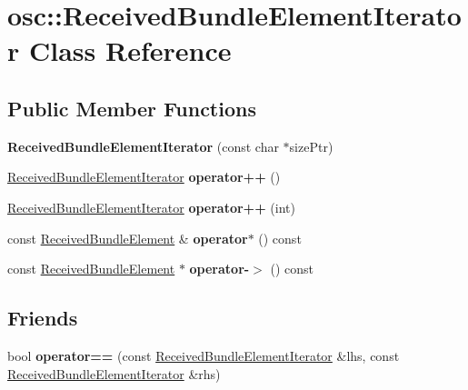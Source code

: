 \hypertarget{classosc_1_1_received_bundle_element_iterator}{}\section{osc\+:\+:Received\+Bundle\+Element\+Iterator Class Reference}
\label{classosc_1_1_received_bundle_element_iterator}
\subsection*{Public Member Functions}
\begin{DoxyCompactItemize}
\item 
\mbox{\label{classosc_1_1_received_bundle_element_iterator_a647f531539d474e425d6222befe4a56f}} 
{\bfseries Received\+Bundle\+Element\+Iterator} (const char $\ast$size\+Ptr)
\item 
\mbox{\label{classosc_1_1_received_bundle_element_iterator_ac19a91cef083f315aad40ebb49e7c4d3}} 
\hyperlink{classosc_1_1_received_bundle_element_iterator}{Received\+Bundle\+Element\+Iterator} {\bfseries operator++} ()
\item 
\mbox{\label{classosc_1_1_received_bundle_element_iterator_a4a9a68466ea3015b7185e9a52a75e789}} 
\hyperlink{classosc_1_1_received_bundle_element_iterator}{Received\+Bundle\+Element\+Iterator} {\bfseries operator++} (int)
\item 
\mbox{\label{classosc_1_1_received_bundle_element_iterator_a30d3db30646a4cf344dc348c9efe01be}} 
const \hyperlink{classosc_1_1_received_bundle_element}{Received\+Bundle\+Element} \& {\bfseries operator$\ast$} () const
\item 
\mbox{\label{classosc_1_1_received_bundle_element_iterator_a469278e8bb17a089e740774c44ad104e}} 
const \hyperlink{classosc_1_1_received_bundle_element}{Received\+Bundle\+Element} $\ast$ {\bfseries operator-\/$>$} () const
\end{DoxyCompactItemize}
\subsection*{Friends}
\begin{DoxyCompactItemize}
\item 
\mbox{\label{classosc_1_1_received_bundle_element_iterator_ac3c78566886af21ed8861a5b4660f429}} 
bool {\bfseries operator==} (const \hyperlink{classosc_1_1_received_bundle_element_iterator}{Received\+Bundle\+Element\+Iterator} \&lhs, const \hyperlink{classosc_1_1_received_bundle_element_iterator}{Received\+Bundle\+Element\+Iterator} \&rhs)
\end{DoxyCompactItemize}


